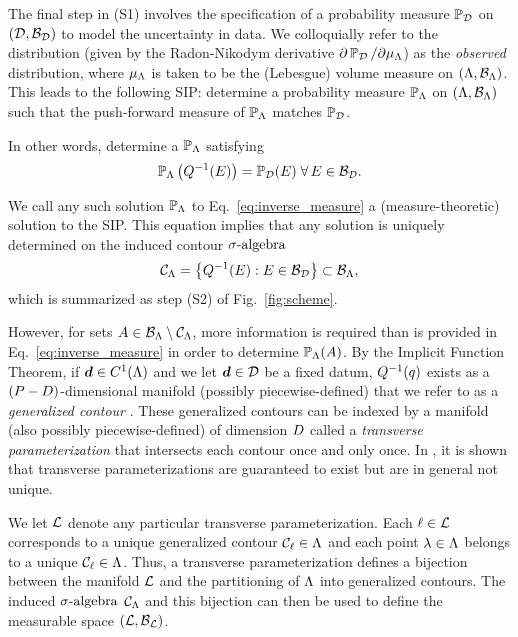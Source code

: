 The final step in (S1) involves the specification of a probability measure $\operatorname*{\mathbb{P}_{\mathcal{D}}}$ on ${(\mathcal{D}, \mathcal{B}_{\mathcal{D}})}$ to model the uncertainty in data.
We colloquially refer to the distribution (given by the Radon-Nikodym derivative $\partial \operatorname*{\mathbb{P}_{\mathcal{D}}} / \partial \mu_{{\Lambda}}$) as the \emph{observed} distribution, where $\mu_{{\Lambda}}$ is taken to be the (Lebesgue) volume measure on ${({\Lambda}, \mathcal{B}_{{\Lambda}})}$.
This leads to the following SIP: determine a probability measure $\operatorname*{\mathbb{P}_{{\Lambda}}}$ on ${({\Lambda}, \mathcal{B}_{{\Lambda}})}$ such that the push-forward measure of $\operatorname*{\mathbb{P}_{{\Lambda}}}$ matches $\operatorname*{\mathbb{P}_{\mathcal{D}}}$.

In other words, determine a $\operatorname*{\mathbb{P}_{{\Lambda}}}$ satisfying
\begin{equation}\label{eq:inverse_measure}
\operatorname*{\mathbb{P}_{{\Lambda}}} \left ( Q^{-1}(E)\right ) = \mathbb{P}_{\mathcal{D}}(E) \; \forall \, E \in \mathcal{B}_{\mathcal{D}}.
\end{equation}

We call any such solution $\operatorname*{\mathbb{P}_{{\Lambda}}}$ to Eq.~\eqref{eq:inverse_measure} a (measure-theoretic) solution to the SIP.
This equation implies that any solution is uniquely determined on the induced contour $\sigma\text{-algebra}$
\begin{equation}\label{eq:contour_sa}
\mathcal{C}_{{\Lambda}} = \left\{Q^{-1}(E) : E \in \mathcal{B}_{\mathcal{D}} \right\} \subset \mathcal{B}_{{\Lambda}},
\end{equation}
which is summarized as step (S2) of Fig.~\ref{fig:scheme}.

However, for sets $A \in \mathcal{B}_{{\Lambda}} \setminus \mathcal{C}_{{\Lambda}}$, more information is required than is provided in Eq.~\eqref{eq:inverse_measure} in order to determine $\operatorname*{\mathbb{P}_{{\Lambda}}} (A)$.
By the Implicit Function Theorem, if $\operatorname*{\boldsymbol{d}} \in C^1 ({\Lambda})$ and we let $\operatorname*{\boldsymbol{d}}\in\mathcal{D}$ be a fixed datum, $Q^{-1}(q)$ exists as a $(P-D)$\--dimensional manifold (possibly piecewise-defined) that we refer to as a \emph{generalized contour} \cite{BET+14}.
These generalized contours can be indexed by a manifold (also possibly piecewise-defined) of dimension $D$ called a \emph{transverse parameterization} that intersects each contour once and only once.
In \cite{BET+14}, it is shown that transverse parameterizations are guaranteed to exist but are in general not unique.

We let $\mathcal{L}$ denote any particular transverse parameterization.
Each $\ell\in\mathcal{L}$ corresponds to a unique generalized contour $\mathcal{C}_\ell \in {\Lambda}$ and each point $\lambda\in{\Lambda}$ belongs to a unique $\mathcal{C}_\ell\in{\Lambda}$.
Thus, a transverse parameterization defines a bijection between the manifold $\mathcal{L}$ and the partitioning of ${\Lambda}$ into generalized contours.
The induced $\sigma\text{-algebra}$ $\mathcal{C}_{{\Lambda}}$ and this bijection can then be used to define the measurable space $(\mathcal{L}, \mathcal{B}_{\mathcal{L}})$.

